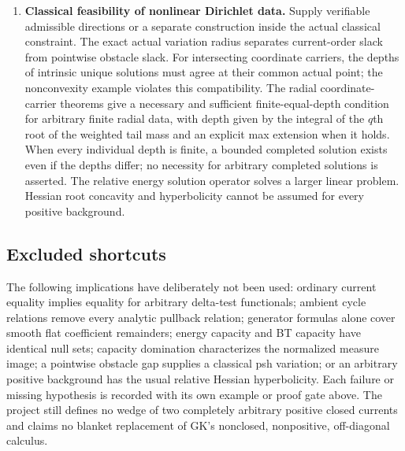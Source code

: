 \documentclass[11pt,a4paper]{article}
\numberwithin{equation}{section}
\theoremstyle{definition}
\theoremstyle{remark}
\begin{document}
\begin{enumerate}
\item \textbf{Classical feasibility of nonlinear Dirichlet data.}
Supply verifiable admissible directions or a separate construction
inside the actual classical constraint. The exact actual variation
radius separates current-order slack from pointwise obstacle slack.
For intersecting coordinate carriers, the depths of intrinsic unique solutions must agree at their
common actual point; the nonconvexity example violates this compatibility.
The radial coordinate-carrier theorems give a necessary and sufficient
finite-equal-depth condition for arbitrary finite radial data, with
depth given by the integral of the $q$th root of the weighted tail
mass and an explicit max extension when it holds. When every individual depth is finite, a bounded completed solution
exists even if the depths differ; no necessity for arbitrary completed
solutions is asserted. The relative energy solution operator
solves a larger linear problem. Hessian root concavity and
hyperbolicity cannot be assumed for every positive background.
\end{enumerate}

\subsection{Excluded shortcuts}

The following implications have deliberately not been used: ordinary
current equality implies equality for arbitrary delta-test functionals;
ambient cycle relations remove every analytic pullback relation;
generator formulas alone cover smooth flat coefficient remainders;
energy capacity and BT capacity have identical null sets; capacity
domination characterizes the normalized measure image; a pointwise
obstacle gap supplies a classical psh variation; or an arbitrary
positive background has the usual relative Hessian hyperbolicity.
Each failure or missing hypothesis is recorded with its own example
or proof gate above. The project still defines no wedge of two
completely arbitrary positive closed currents and claims no blanket
replacement of GK's nonclosed, nonpositive, off-diagonal calculus.

\end{document}
